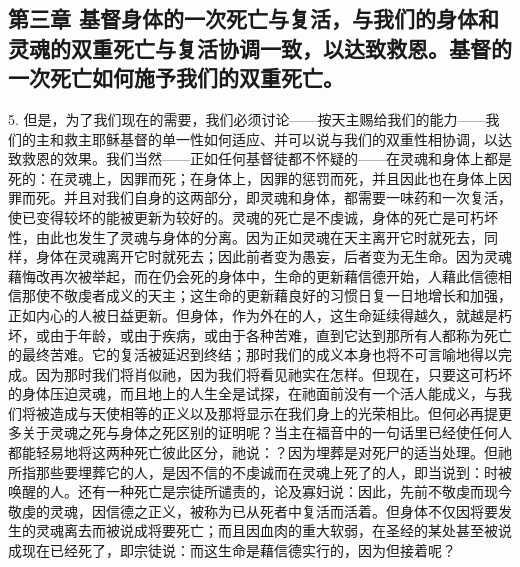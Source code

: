 
\subsection{第三章 基督身体的一次死亡与复活，与我们的身体和灵魂的双重死亡与复活协调一致，以达致救恩。基督的一次死亡如何施予我们的双重死亡。}

5. 但是，为了我们现在的需要，我们必须讨论——按天主赐给我们的能力——我们的主和救主耶稣基督的单一性如何适应、并可以说与我们的双重性相协调，以达致救恩的效果。我们当然——正如任何基督徒都不怀疑的——在灵魂和身体上都是死的：在灵魂上，因罪而死；在身体上，因罪的惩罚而死，并且因此也在身体上因罪而死。并且对我们自身的这两部分，即灵魂和身体，都需要一味药和一次复活，使已变得较坏的能被更新为较好的。灵魂的死亡是不虔诚，身体的死亡是可朽坏性，由此也发生了灵魂与身体的分离。因为正如灵魂在天主离开它时就死去，同样，身体在灵魂离开它时就死去；因此前者变为愚妄，后者变为无生命。因为灵魂藉悔改再次被举起，而在仍会死的身体中，生命的更新藉信德开始，人藉此信德相信那使不敬虔者成义的天主；这生命的更新藉良好的习惯日复一日地增长和加强，正如内心的人被日益更新。但身体，作为外在的人，这生命延续得越久，就越是朽坏，或由于年龄，或由于疾病，或由于各种苦难，直到它达到那所有人都称为死亡的最终苦难。它的复活被延迟到终结；那时我们的成义本身也将不可言喻地得以完成。因为那时我们将肖似祂，因为我们将看见祂实在怎样。但现在，只要这可朽坏的身体压迫灵魂，而且地上的人生全是试探，在祂面前没有一个活人能成义，与我们将被造成与天使相等的正义以及那将显示在我们身上的光荣相比。但何必再提更多关于灵魂之死与身体之死区别的证明呢？当主在福音中的一句话里已经使任何人都能轻易地将这两种死亡彼此区分，祂说：？因为埋葬是对死尸的适当处理。但祂所指那些要埋葬它的人，是因不信的不虔诚而在灵魂上死了的人，即当说到：时被唤醒的人。还有一种死亡是宗徒所谴责的，论及寡妇说：因此，先前不敬虔而现今敬虔的灵魂，因信德之正义，被称为已从死者中复活而活着。但身体不仅因将要发生的灵魂离去而被说成将要死亡；而且因血肉的重大软弱，在圣经的某处甚至被说成现在已经死了，即宗徒说：而这生命是藉信德实行的，因为但接着呢？\par

